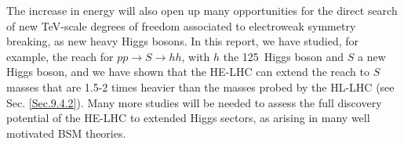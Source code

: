 \documentclass[../report.tex]{subfiles}
\begin{document}
The increase in energy will also open up many opportunities for the direct search of new TeV-scale degrees of freedom associated to electroweak symmetry breaking, as new heavy Higgs bosons. In this report, we have studied, for example, the reach for $pp \rightarrow S \rightarrow hh$, with $h$ the 125~\UGeV Higgs boson and $S$ a new Higgs boson, and we have shown that the HE-LHC can extend the reach to $S$ masses that are 1.5-2 times heavier than the masses probed by the HL-LHC (see Sec. \ref{Sec.9.4.2}). Many more studies will be needed to assess the full discovery potential of the HE-LHC to extended Higgs sectors, as arising in many well motivated BSM theories.
\end{document}
